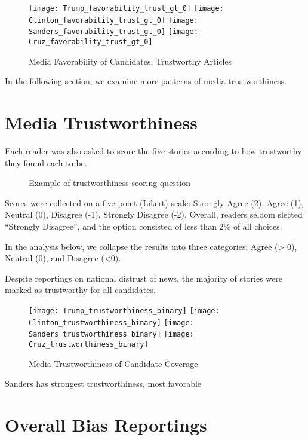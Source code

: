 \begin{figure}[h!] 
\centering
  \texttt{[image: Trump\_favorability\_trust\_gt\_0]} 
  \texttt{[image: Clinton\_favorability\_trust\_gt\_0]} 
  \texttt{[image: Sanders\_favorability\_trust\_gt\_0]} 
  \texttt{[image: Cruz\_favorability\_trust\_gt\_0]} 
  \caption{Media Favorability of Candidates, Trustworthy Articles}
\end{figure}

In the following section, we examine more patterns of media trustworthiness.


\section{Media Trustworthiness}

Each reader was also asked to score the five stories according to how trustworthy they found each to be. 

\begin{figure}[h!] 
\centering
  \caption{Example of trustworthiness scoring question}
\end{figure}

Scores were collected on a five-point (Likert) scale: Strongly Agree (2), Agree (1), Neutral (0), Disagree (-1), Strongly Disagree (-2). Overall, readers seldom slected ``Strongly Disagree'', and the option consisted of less than 2\% of all choices.

In the analysis below, we collapse the results into three categories: Agree (> 0), Neutral (0), and Disagree (<0).

Despite reportings on national distrust of news, the majority of stories were marked as trustworthy for all candidates.

\begin{figure}[h!] 
\centering
  \texttt{[image: Trump\_trustworthiness\_binary]} 
  \texttt{[image: Clinton\_trustworthiness\_binary]} 
  \texttt{[image: Sanders\_trustworthiness\_binary]} 
  \texttt{[image: Cruz\_trustworthiness\_binary]} 
  \caption{Media Trustworthiness of Candidate Coverage}
\end{figure}

 Sanders has strongest trustworthiness, most favorable



 

\section{Overall Bias Reportings}


%
 